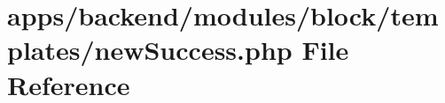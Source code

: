 \hypertarget{backend_2modules_2block_2templates_2new_success_8php}{\section{apps/backend/modules/block/templates/new\-Success.php File Reference}
\label{backend_2modules_2block_2templates_2new_success_8php}
}
